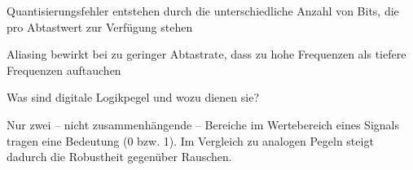 \documentclass
[
  draft    = true,
  fontsize = 11pt,
  parskip  = half-,
  BCOR     = 0pt,
  DIV      = 11,
  ngerman,
  dvipsnames
]
{scrartcl}
\begin{document}
\begin{mytemize}
        \begin{achim}
          \begin{mytemize}
            \item Quantisierungsfehler entstehen durch die unterschiedliche Anzahl von Bits, die pro Abtastwert zur Verfügung stehen
            \item Aliasing bewirkt bei zu geringer Abtastrate, dass zu hohe Frequenzen als tiefere Frequenzen auftauchen
          \end{mytemize}
        \end{achim}
  \item Was sind digitale Logikpegel und wozu dienen sie? 
        \begin{achim}
          \begin{mytemize}
            \item Nur zwei -- nicht zusammenhängende -- Bereiche im Wertebereich eines Signals
                  tragen eine Bedeutung (0 bzw. 1). Im Vergleich zu analogen Pegeln steigt  
                  dadurch die Robustheit gegenüber Rauschen.
          \end{mytemize}
        \end{achim}
\end{mytemize}

\end{document}
